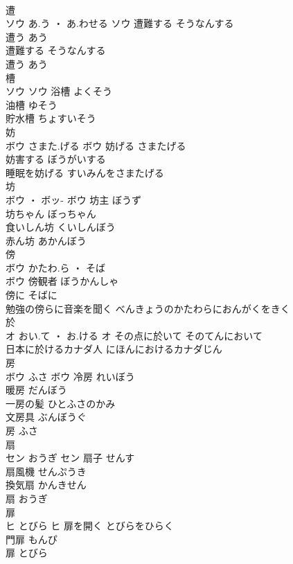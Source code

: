 \documentclass[8pt]{extreport}
\begin{document}
\begin{CJK}{UTF8}{min}
\\	遭	
\\	ソウ	あ.う ・ あ.わせる	ソウ	遭難する	そうなんする	
\\	遭う	あう	
\\	遭難する	そうなんする	
\\	遭う	あう	
\\	槽	
\\	ソウ		ソウ	浴槽	よくそう	
\\	油槽	ゆそう	
\\	貯水槽	ちょすいそう	
\\	妨	
\\	ボウ	さまた.げる	ボウ	妨げる	さまたげる	
\\	妨害する	ぼうがいする	
\\	睡眠を妨げる	すいみんをさまたげる	
\\	坊	
\\	ボウ ・ ボッ-		ボウ													坊主	ぼうず	
\\	坊ちゃん	ぼっちゃん	
\\	食いしん坊	くいしんぼう	
\\	赤ん坊	あかんぼう	
\\	傍	
\\	ボウ	かたわ.ら ・ そば
\\	ボウ	傍観者	ぼうかんしゃ	
\\	傍に	そばに	
\\	勉強の傍らに音楽を聞く	べんきょうのかたわらにおんがくをきく	
\\	於	
\\	オ	おい.て ・ お.ける	オ	その点に於いて	そのてんにおいて	
\\	日本に於けるカナダ人	にほんにおけるカナダじん	
\\	房	
\\	ボウ	ふさ	ボウ	冷房	れいぼう	
\\	暖房	だんぼう	
\\	一房の髪	ひとふさのかみ	
\\	文房具	ぶんぼうぐ	
\\	房	ふさ	
\\	扇	
\\	セン	おうぎ	セン	扇子	せんす	
\\	扇風機	せんぷうき	
\\	換気扇	かんきせん	
\\	扇	おうぎ	
\\	扉	
\\	ヒ	とびら	ヒ	扉を開く	とびらをひらく	
\\	門扉	もんぴ	
\\	扉	とびら	

\end{CJK}
\end{document}
